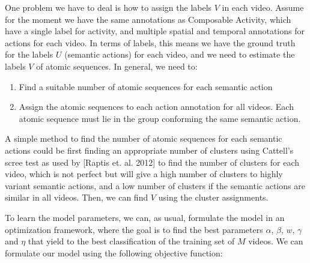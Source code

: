 \documentclass[10pt,letterpaper]{article}
\newcommand{\+}[1]{\ensuremath{{\boldsymbol #1}}}
\begin{document}
One problem we have to deal is how to assign the labels $V$ in each video. Assume for the moment we have the same annotations as Composable Activity, which have a single label for activity, and multiple spatial and temporal annotations for actions for each video. In terms of labels, this means we have the ground truth for the labels $U$ (semantic actions) for each video, and we need to estimate the labels $V$ of atomic sequences.  In general, we need to:
\begin{enumerate}
\item Find a suitable number of atomic sequences for each semantic action
\item Assign the atomic sequences to each action annotation for all videos. Each atomic sequence must lie in the group conforming the same semantic action.
\end{enumerate}

A simple method to find the number of atomic sequences for each semantic actions could be first finding an appropriate number of clusters using Cattell's scree test as used by [Raptis et. al. 2012] to find the number of clusters for each video, which is not perfect but will give a high number of clusters to highly variant semantic actions, and a low number of clusters if the semantic actions are similar in all videos. Then, we can find $V$ using the cluster assignments. 

\vspace{1em}
To learn the model parameters, we can, as usual, formulate the model in an optimization framework, where the goal is to find the best parameters $\alpha$, $\beta$, $w$, $\gamma$ and $\eta$ that yield to the best classification of the training set of $M$ videos.  We can formulate our model using the following objective function:
\end{document}
